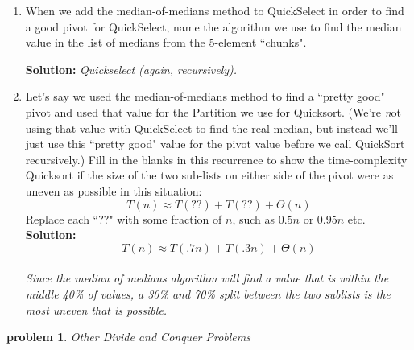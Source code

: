 \documentclass[10pt]{article}
\newtheorem{problem}{\sc\color{cit}problem}
\begin{document}
    \begin{enumerate}   
    	\item When we add the median-of-medians method to QuickSelect in order to find a good pivot for QuickSelect, name the algorithm we use to find the median value in the list of medians from the 5-element ``chunks".
    	
    	\textbf{Solution:}  \emph{
            Quickselect (again, recursively).
        }

        \item Let's say we used the median-of-medians method to find a ``pretty good" pivot and used that value for the Partition we use for Quicksort.  (We're {\emph not} using that value with QuickSelect to find the real median, but instead we'll just use this ``pretty good" value for the pivot value before we call QuickSort recursively.)  Fill in the blanks in this recurrence to show the time-complexity Quicksort if the size of the two sub-lists on either side of the pivot were as uneven as possible in this situation:
                $$ T(n) \approx T( ?? ) + T( ?? ) + \Theta(n)$$
        Replace each ``??" with some fraction of $n$, such as $ 0.5 n$ or $ 0.95 n$ etc.
        \textbf{Solution:} \\
        $$ T(n) \approx T(.7n) + T(.3n) + \Theta(n)$$ \\
        \emph {Since the median of medians algorithm will find a value that is within the middle 40\% of values, a 30\% and 70\% split between the two sublists is the most uneven that is possible.}
    \end{enumerate} 


\begin{problem} Other Divide and Conquer Problems \end{problem}
\end{document}
